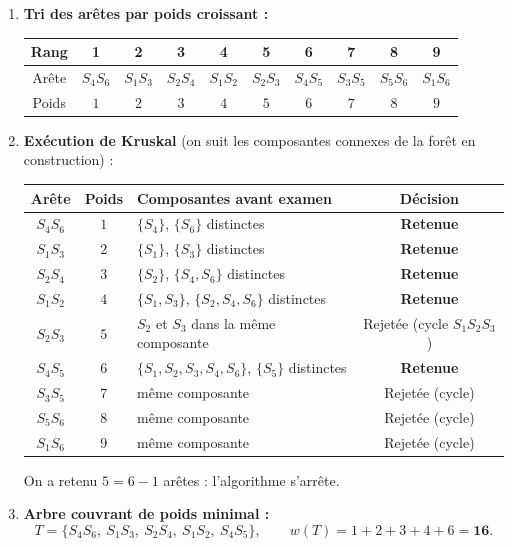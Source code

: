 \documentclass[11pt]{article}
\begin{document}
\begin{corrige}
\begin{enumerate}
\item \textbf{Tri des arêtes par poids croissant :}
\begin{center}
\begin{tabular}{|c|c|c|c|c|c|c|c|c|c|}
\hline
\rowcolor{popblueL} Rang & 1 & 2 & 3 & 4 & 5 & 6 & 7 & 8 & 9 \\
\hline
Arête & $S_4S_6$ & $S_1S_3$ & $S_2S_4$ & $S_1S_2$ & $S_2S_3$ & $S_4S_5$ & $S_3S_5$ & $S_5S_6$ & $S_1S_6$ \\
\hline
Poids & $1$ & $2$ & $3$ & $4$ & $5$ & $6$ & $7$ & $8$ & $9$ \\
\hline
\end{tabular}
\end{center}
\item \textbf{Exécution de Kruskal} (on suit les composantes connexes de la forêt en construction) :
\begin{center}
\begin{tabular}{|c|c|l|c|}
\hline
\rowcolor{popblueL} Arête & Poids & Composantes avant examen & Décision \\
\hline
$S_4S_6$ & $1$ & $\{S_4\}$, $\{S_6\}$ distinctes & \textbf{Retenue} \\
$S_1S_3$ & $2$ & $\{S_1\}$, $\{S_3\}$ distinctes & \textbf{Retenue} \\
$S_2S_4$ & $3$ & $\{S_2\}$, $\{S_4, S_6\}$ distinctes & \textbf{Retenue} \\
$S_1S_2$ & $4$ & $\{S_1, S_3\}$, $\{S_2, S_4, S_6\}$ distinctes & \textbf{Retenue} \\
$S_2S_3$ & $5$ & $S_2$ et $S_3$ dans la même composante & Rejetée (cycle $S_1S_2S_3$) \\
$S_4S_5$ & $6$ & $\{S_1,S_2,S_3,S_4,S_6\}$, $\{S_5\}$ distinctes & \textbf{Retenue} \\
$S_3S_5$ & $7$ & même composante & Rejetée (cycle) \\
$S_5S_6$ & $8$ & même composante & Rejetée (cycle) \\
$S_1S_6$ & $9$ & même composante & Rejetée (cycle) \\
\hline
\end{tabular}
\end{center}
On a retenu $5 = 6 - 1$ arêtes : l'algorithme s'arrête.
\item \textbf{Arbre couvrant de poids minimal :}
\[ T = \{S_4S_6,\ S_1S_3,\ S_2S_4,\ S_1S_2,\ S_4S_5\}, \qquad w(T) = 1 + 2 + 3 + 4 + 6 = \mathbf{16}. \]
\end{enumerate}
\end{corrige}
\end{document}
